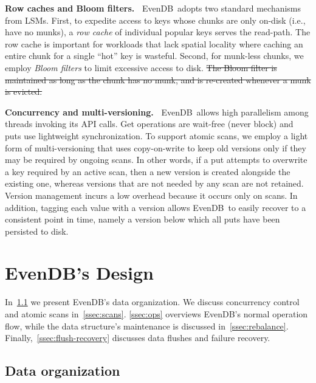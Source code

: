 \documentclass[sigplan,10pt]{acmart}
\newcommand{\sys}{EvenDB}
\providecommand{\DIFdel}[1]{{\protect\color{red}\sout{#1}}}                      %
\providecommand{\DIFdelbegin}{} %
\providecommand{\DIFdelend}{} %
\begin{document}
 
 {\bf Row caches and Bloom filters.\ }
 \sys\ adopts two standard mechanisms from LSMs. First, to expedite access to  keys whose chunks are only on-disk  (i.e., have no munks), 
a \emph{row cache} of individual popular keys serves the read-path. The row cache is important for workloads that lack
spatial locality where caching an entire chunk for a single ``hot'' key is wasteful. 
Second, for munk-less chunks, we employ \emph{Bloom filters} to limit excessive access to disk. 
\DIFdelbegin \DIFdel{The Bloom filter is maintained as long as the chunk has no munk, and is re-created whenever a munk is evicted.
}\DIFdelend 

{\bf Concurrency and multi-versioning.\ }
 \sys\ allows high parallelism among threads invoking its API calls. 
 Get operations are wait-free (never block) and puts use lightweight synchronization. 
 To support atomic scans, we  employ a light form of multi-versioning that uses 
copy-on-write to keep old versions only if they may be required by ongoing scans. 
In other words, if a put attempts to overwrite a key required by an active scan, then a new version is created alongside the 
existing one, whereas versions that are not needed by any scan are not retained. 
Version management incurs a low overhead because it occurs only on scans. 
In addition, tagging each value with a version allows \sys\ to easily recover to a consistent point in time, namely a version below which all puts have been persisted to disk.



\section{\sys's Design}
\label{sec:design}


In~\cref{ssec:layout} we present \sys's data organization. 
We discuss concurrency control and atomic scans in~\cref{ssec:scans}.
\cref{ssec:ops} overviews \sys's normal %
operation flow, while   the data structure's maintenance is discussed in~\cref{ssec:rebalance}.
Finally,~\cref{ssec:flush-recovery} discusses data flushes and failure recovery.


\subsection{Data organization}
\label{ssec:layout}

\end{document}
